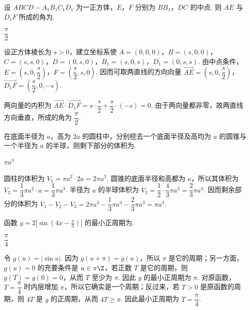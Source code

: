 \documentclass[UTF8,a4paper,oneside,11pt]{ctexbook}
\begin{document}
\begin{problem}
设 \(ABCD-A_1B_1C_1D_1\) 为一正方体，\(E\)，\(F\) 分别为 \(BB_1\)，\(DC\) 的中点. 则 \(AE\) 与 \(D_1F\) 所成的角为\fillinblank{}.
\end{problem}

\begin{answer}
\(\dfrac{\pi}{2}\)
\end{answer}

\begin{solution}
设正方体棱长为 \(s>0\)，建立坐标系使 \(A=(0,0,0)\)，\(B=(s,0,0)\)，\(C=(s,s,0)\)，\(D=(0,s,0)\)，\(B_1=(s,0,s)\)，\(D_1=(0,s,s)\). 由中点条件，\(E=\left(s,0,\dfrac{s}{2}\right)\)，\(F=\left(\dfrac{s}{2},s,0\right)\). 因而可取两直线的方向向量
\(\overrightarrow{AE}=\left(s,0,\dfrac{s}{2}\right)\)，\(\overrightarrow{D_1F}=\left(\dfrac{s}{2},0,-s\right)\).

两向量的内积为 \(\overrightarrow{AE}\cdot\overrightarrow{D_1F}=s\cdot\dfrac{s}{2}+\dfrac{s}{2}\cdot(-s)=0\). 由于两向量都非零，故两直线方向垂直，所成的角为 \(\dfrac{\pi}{2}\).
\end{solution}

\begin{problem}
在底面半径为 \(a\)，高为 \(2a\) 的圆柱中，分别挖去一个底面半径及高均为 \(a\) 的圆锥与一个半径为 \(a\) 的半球，则剩下部分的体积为\fillinblank{}.
\end{problem}

\begin{answer}
\(\pi a^3\)
\end{answer}

\begin{solution}
圆柱的体积为 \(V_1=\pi a^2\cdot2a=2\pi a^3\). 圆锥的底面半径和高都为 \(a\)，所以其体积为 \(V_2=\dfrac13\pi a^2\cdot a=\dfrac13\pi a^3\). 半径为 \(a\) 的半球体积为 \(V_3=\dfrac12\cdot\dfrac43\pi a^3=\dfrac23\pi a^3\). 因而剩余部分的体积为
\(V_1-V_2-V_3=2\pi a^3-\dfrac13\pi a^3-\dfrac23\pi a^3=\pi a^3\).
\end{solution}

\begin{problem}
函数 \(y=2\left|\sin\left(4x-\frac{\pi}{3}\right)\right|\) 的最小正周期为\fillinblank{}.
\end{problem}

\begin{answer}
\(\dfrac{\pi}{4}\)
\end{answer}

\begin{solution}
令 \(g(u)=|\sin u|\). 因为 \(g(u+\pi)=g(u)\)，所以 \(\pi\) 是它的周期；另一方面，\(g(u)=0\) 的充要条件是 \(u\in\pi\Z\)，若正数 \(T\) 是它的周期，则 \(g(T)=g(0)=0\)，从而 \(T\) 至少为 \(\pi\). 因此 \(g\) 的最小正周期为 \(\pi\). 对原函数，\(T=\dfrac{\pi}{4}\) 时内层增加 \(\pi\)，所以它确实是一个周期；反过来，若 \(T>0\) 是原函数的周期，则 \(4T\) 是 \(g\) 的正周期，从而 \(4T\geqslant\pi\). 因此最小正周期为 \(T=\dfrac{\pi}{4}\).
\end{solution}
\end{document}
